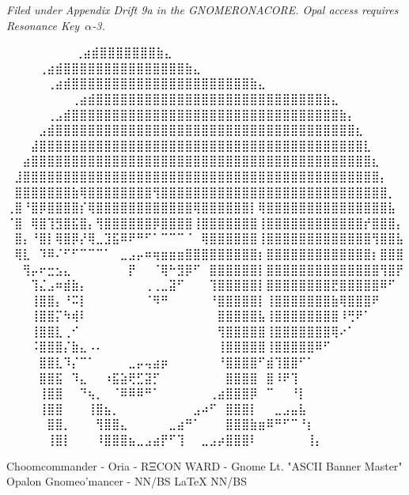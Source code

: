 \vspace{2em}
\begin{flushright}
\textit{Filed under Appendix Drift 9a in the GNOMERONACORE. Opal access requires Resonance Key~$\alpha$-3.}
\end{flushright}

\iffalse



⠀⠀⠀⠀⠀⠀             ⠀⠀⢀⣴⣾⣿⣿⣿⣿⣿⣿⣿⣷⣄⠀⠀⠀⠀⠀⠀⠀⠀
⠀⠀⠀  ⠀      ⠀⠀⠀⠀⢀⣴⣾⣿⣿⣿⣿⣿⣿⣿⣿⣿⣿⣿⣿⣿⣿⣿⣷⣄⠀⠀⠀⠀⠀⠀⠀⠀
⠀⠀ ⠀   ⠀⠀⠀⠀⠀⢀⣴⣾⣿⣿⣿⣿⣿⣿⣿⣿⣿⣿⣿⣿⣿⣿⣿⣿⣿⣿⣿⣿⣿⣿⣷⣄⠀⠀⠀⠀⠀⠀⠀⠀
⠀⠀⠀⠀⠀⠀⠀⠀⢀⣴⣾⣿⣿⣿⣿⣿⣿⣿⣿⣿⣿⣿⣿⣿⣿⣿⣿⣿⣿⣿⣿⣿⣿⣿⣿⣿⣿⣿⣿⣷⣄⠀⠀⠀⠀⠀⠀⠀⠀
⠀⠀⠀⠀⠀⢀⣠⣾⣿⣿⣿⣿⣿⣿⣿⣿⣿⣿⣿⣿⣿⣿⣿⣿⣿⣿⣿⣿⣿⣿⣿⣿⣿⣿⣿⣿⣿⣿⣿⣿⣿⣷⡄⠀⠀⠀⠀⠀⠀
⠀⠀⠀⠀⣠⣾⣿⣿⣿⣿⣿⣿⣿⣿⣿⣿⣿⣿⣿⣿⣿⣿⣿⣿⣿⣿⣿⣿⣿⣿⣿⣿⣿⣿⣿⣿⣿⣿⣿⣿⣿⣿⣿⣆⠀⠀⠀⠀⠀
⠀⠀⠀⣼⣿⣿⣿⣿⣿⣿⣿⣿⣿⣿⣿⣿⣿⣿⣿⣿⣿⣿⣿⣿⣿⣿⣿⣿⣿⣿⣿⣿⣿⣿⣿⣿⣿⣿⣿⣿⣿⣿⣿⣿⣇⠀⠀⠀⠀
⠀⠀⣴⣿⣿⣿⣿⣿⣿⣿⣿⣿⣿⣿⣿⣿⣿⣿⣿⣿⣿⣿⣿⣿⣿⣿⣿⣿⣿⣿⣿⣿⣿⣿⣿⣿⣿⣿⣿⣿⣿⣿⣿⣿⣿⣆⠀⠀⠀
⠀⣸⣿⣿⣿⣿⣿⣿⣿⣿⣿⣿⣿⣿⣿⣿⣿⣿⣿⣿⣿⣿⣿⣿⣿⣿⣿⣿⣿⣿⣿⣿⣿⣿⣿⣿⣿⣿⣿⣿⣿⣿⣿⣿⣿⣿⡄⠀⠀
⠀⣿⣿⣿⣿⣿⣿⣿⣷⢿⣿⣿⣿⣿⣿⣿⣿⣿⢻⣿⣿⣿⣿⣿⣿⣿⣿⣿⣿⣿⣿⣿⣿⣿⣿⣿⣿⣿⣿⣿⣿⣿⣿⣿⣿⣿⣿⡀⠀
⢀⣿⠘⣿⡿⣿⣿⣿⣿⡎⢿⣿⣿⣿⣿⣿⣿⣿⣿⣿⣿⣿⣿⢿⣿⣿⣿⣿⣿⣿⡇⢿⣿⣿⣿⣿⣿⣿⣿⣿⣿⣿⣿⣿⣿⣿⣿⣧⠀
⠈⣿⠀⢿⣿⢹⣻⣿⣯⣿⡄⢻⣿⣿⣿⣿⣿⣿⡿⣿⣿⣿⣿⢸⣿⣿⣿⣿⣿⣿⣿⢸⣿⣿⣿⣿⣿⣿⣿⣿⣿⣿⣿⣿⡞⣿⣿⣿⡄
⠀⣿⡄⠘⣿⡇⢿⣿⡿⡜⢿⣀⣹⣯⠿⠟⠛⠋⠁⠉⠉⠉⠈⠀⢿⣿⣿⣿⣿⣿⣿⢸⣿⣿⣿⣿⣿⣿⣿⣿⣿⣿⣿⣿⣿⢻⣿⣿⣧
⠀⢿⣇⠀⠹⠿⠌⠋⠋⠉⠉⠉⠁⠀⣀⣠⡤⠶⢶⣶⣶⣶⣿⣿⣿⣿⣿⣿⣿⣿⣿⡆⣿⣿⣿⣿⣿⣿⣿⣿⣿⣿⣿⣿⣿⡆⣿⣿⣿
⠀⠀⢻⡤⠖⣒⣢⣄⠀⠀⠀⠀⠀⠀⠀⡟⠀⠀⠈⢿⠓⣻⡿⠋⠀⣿⣿⣿⣿⣿⣿⡇⣿⣿⣿⣿⣿⣿⣿⣿⣿⣿⣿⣿⣿⣿⢻⣿⡟
⠀⠀⠀⢹⣌⣠⠶⣾⣷⡄⠀⠀⠀⠀⠀⠀⠀⢀⢀⣀⣽⠋⠀⠀⠀⢹⣿⣿⣿⣿⣿⡇⣿⣿⣿⣿⣿⣿⣿⣿⣟⣿⣿⣿⣿⣿⠿⠋⠀
⠀⠀⠀⢸⣿⣿⡄⠘⠭⡇⠀⠀⠀⠀⠀⠀⠀⠈⠻⠛⠀⠀⠀⠀⠀⠘⣿⣿⣿⣿⣿⡇⢸⣿⣿⣿⣿⣿⣿⣿⣷⢿⣿⣿⣿⠟⠀⠀⠀
⠀⠀⠀⢸⣿⣿⡍⠳⢾⠇⠀⠀⠀⠀⠀⠀⠀⠀⠀⠀⠀⠀⠀⠀⠀⠀⣿⣿⣿⣿⣿⣧⢸⣿⣿⣿⣿⣿⣿⣿⣿⠸⢛⠟⠁⠀⠀⠀⠀
⠀⠀⠀⢸⣿⣿⣇⢀⠊⠀⠀⠀⠀⠀⠀⠀⠀⠀⠀⠀⠀⠀⠀⠀⠀⠀⢻⣿⣿⣿⣿⣿⢸⣿⣿⣿⣿⣿⣿⣿⢿⠔⠁⠀⠀⠀⠀⠀⠀
⠀⠀⠀⠨⣿⣿⣿⡌⣷⣄⠠⠄⠀⠀⠀⠀⠀⠀⠀⠀⠀⠀⠀⠀⠀⠀⢸⣿⣿⣿⣿⣿⢸⣿⣿⣿⣿⣿⠿⠋⠀⠀⠀⠀⠀⠀⠀⠀⠀
⠀⠀⠀⠀⣿⣿⣇⠹⡌⠉⠁⠀⠀⠀⠀⣀⡤⢤⣴⡶⠀⠀⠀⠀⠀⠀⠘⣿⣿⣿⣿⠋⣾⢹⣿⣿⠋⠁⠀⠀⠀⠀⠀⠀⠀⠀⠀⠀⠀
⠀⠀⠀⠀⣿⣿⣯⠀⠹⣄⠀⠀⠰⣯⣵⢟⣋⣽⡋⠀⠀⠀⠀⠀⠀⠀⠀⣿⣿⣿⣿⠀⣿⠸⠟⢹⠀⠀⠀⠀⠀⠀⠀⠀⠀⠀⠀⠀⠀
⠀⠀⠀⠀⢸⣿⣿⠀⠀⠙⢦⡀⠀⠈⠿⠿⠿⠛⠁⠀⠀⠀⠀⠀⠀⢀⣴⣿⣿⣿⡿⠀⠉⠀⠀⠘⡇⠀⠀⠀⠀⠀⠀⠀⠀⠀⠀⠀⠀
⠀⠀⠀⠀⢸⣿⣿⠀⠀⠀⢸⣿⣦⡀⠀⠀⠀⠀⠀⠀⠀⠀⠀⣠⠴⠋⠀⣿⣿⣿⡇⠀⠀⣀⣠⣤⣧⠀⠀⠀⠀⠀⠀⠀⠀⠀⠀⠀⠀
⠀⠀⠀⠀⠀⣿⣿⡀⠀⠀⠀⢻⣿⣿⣄⠀⠀⠀⠀⠀⣀⣴⠛⠁⠀⠀⠀⣿⣿⣿⣷⣶⠿⠛⠋⠉⠘⡆⠀⠀⠀⠀⠀⠀⠀⠀⠀⠀⠀
⠀⠀⠀⠀⠀⢸⣿⡇⠀⠀⠀⠸⣿⣿⣿⣦⣀⣠⣴⡟⠋⢹⠀⠀⣀⣠⡴⣿⣿⣿⠇⠀⠀⠀⠀⠀⠀⢸⡄⠀⠀⠀⠀⠀⠀⠀⠀⠀⠀

Choomcommander - Oria - RΞCON WARD - Gnome Lt. "ASCII Banner Master"
             Opalon Gnomeo'mancer - NN/BS LaTeX{} NN/BS

